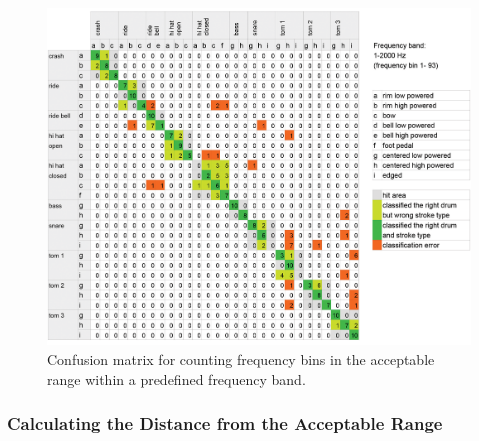 \begin{figure}[htb]
	\centering
	\includegraphics[width=\textwidth]{images/classification_matrix/matrix_test_2.png}
	\caption{Confusion matrix for counting frequency bins in the acceptable range within a predefined
frequency band.}
	\label{fig:matrix2}
\end{figure}





\subsubsection{Calculating the Distance from the Acceptable Range}
\label{section:shapeComparisonClassification3}

